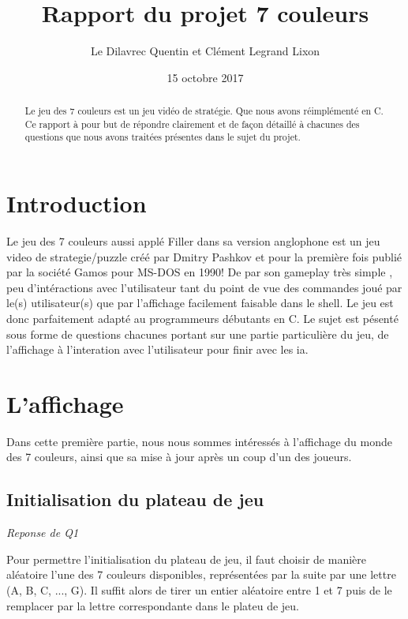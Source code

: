 \documentclass[a4paper,11pt]{article}
\begin{document}
\title{Rapport du projet 7 couleurs}

\author{Le Dilavrec Quentin et Clément Legrand Lixon}

\date{15 octobre 2017}

\maketitle

\begin{abstract}
Le jeu des 7 couleurs est un jeu vidéo de stratégie.
Que nous avons réimplémenté en C. Ce rapport à pour but de répondre 
clairement et de façon détaillé à chacunes des questions  que nous avons
traitées présentes dans le sujet du projet.
\end{abstract}


\section{Introduction}
Le jeu des 7 couleurs aussi applé Filler dans sa version anglophone est 
un jeu video de strategie/puzzle créé par Dmitry Pashkov et pour la première 
fois publié par la société Gamos pour MS-DOS en 1990! De par son gameplay 
très simple , peu d'intéractions avec l'utilisateur tant du point de vue des commandes 
joué par le(s) utilisateur(s) que par l'affichage facilement faisable dans le shell. 
Le jeu est donc parfaitement adapté au programmeurs débutants en C. Le sujet est 
pésenté sous forme de questions chacunes portant sur une partie particulière du jeu, 
de l'affichage à l'interation avec l'utilisateur pour finir avec les ia.


\section{L'affichage}

Dans cette première partie, nous nous sommes intéressés à l'affichage
du monde des 7 couleurs, ainsi que sa mise à jour après un coup d'un des
joueurs.

\subsection{Initialisation du plateau de jeu}
\emph{Reponse de Q1}

Pour permettre l'initialisation du plateau de jeu, il faut choisir de manière
aléatoire l'une des 7 couleurs disponibles, représentées par la suite par 
une lettre (A, B, C, ..., G). Il suffit alors de tirer un entier aléatoire entre 1 et 7
puis de le remplacer par la lettre correspondante dans le plateu de jeu. 
\end{document}
